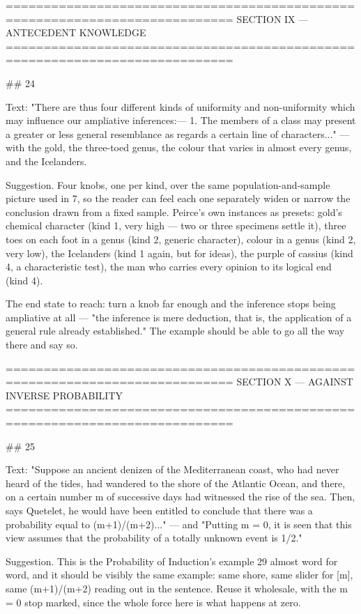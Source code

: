 ============================================================================
SECTION IX — ANTECEDENT KNOWLEDGE
============================================================================

## 24

Text: "There are thus four different kinds of uniformity and non-uniformity which
may influence our ampliative inferences:— 1. The members of a class may present
a greater or less general resemblance as regards a certain line of characters..."
— with the gold, the three-toed genus, the colour that varies in almost every
genus, and the Icelanders.

Suggestion. Four knobs, one per kind, over the same population-and-sample
picture used in 7, so the reader can feel each one separately widen or narrow
the conclusion drawn from a fixed sample. Peirce's own instances as presets:
gold's chemical character (kind 1, very high — two or three specimens settle
it), three toes on each foot in a genus (kind 2, generic character), colour in a
genus (kind 2, very low), the Icelanders (kind 1 again, but for ideas), the
purple of cassius (kind 4, a characteristic test), the man who carries every
opinion to its logical end (kind 4).

The end state to reach: turn a knob far enough and the inference stops being
ampliative at all — "the inference is mere deduction, that is, the application of
a general rule already established." The example should be able to go all the
way there and say so.


============================================================================
SECTION X — AGAINST INVERSE PROBABILITY
============================================================================

## 25

Text: "Suppose an ancient denizen of the Mediterranean coast, who had never
heard of the tides, had wandered to the shore of the Atlantic Ocean, and there,
on a certain number m of successive days had witnessed the rise of the sea.
Then, says Quetelet, he would have been entitled to conclude that there was a
probability equal to (m+1)/(m+2)..." — and "Putting m = 0, it is seen that this
view assumes that the probability of a totally unknown event is 1/2."

Suggestion. This is the Probability of Induction's example 29 almost word for
word, and it should be visibly the same example: same shore, same slider for
[m], same (m+1)/(m+2) reading out in the sentence. Reuse it wholesale, with the
m = 0 stop marked, since the whole force here is what happens at zero.


